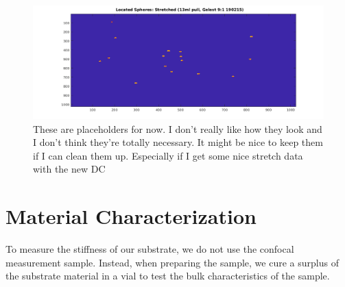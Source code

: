 \begin{figure}[h!]
	\centering
	\includegraphics[width=\linewidth]{Chapters/Figures/13ml_stretched_2D_located}
	\caption[Stretched]{These are placeholders for now. I don't really like how they look and I don't think they're totally necessary. It might be nice to keep them if I can clean them up. Especially if I get some nice stretch data with the new DC}
	\label{fig:13mlstretched2dlocated}
\end{figure}

\section{Material Characterization}
To measure the stiffness of our substrate, we do not use the confocal measurement sample. Instead, when preparing the sample, we cure a surplus of the substrate material in a vial to test the bulk characteristics of the sample. 

